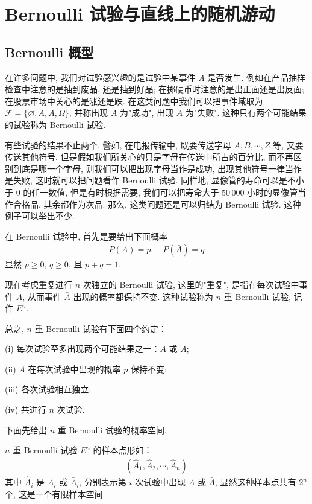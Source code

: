 \documentclass[../../main.tex]{subfiles}
\begin{document}
\section{Bernoulli 试验与直线上的随机游动}\label{section:ch02-Bernoulli试验与随机游动}

\subsection{Bernoulli 概型}

在许多问题中, 我们对试验感兴趣的是试验中某事件 $A$ 是否发生. 例如在产品抽样检查中注意的是抽到废品, 还是抽到好品; 在掷硬币时注意的是出正面还是出反面; 在股票市场中关心的是涨还是跌. 在这类问题中我们可以把事件域取为 $\mathscr{F}=\{\varnothing, A, \bar{A}, \Omega\}$, 并称出现 $A$ 为"成功", 出现 $\bar{A}$ 为"失败". 这种只有两个可能结果的试验称为 Bernoulli 试验.

有些试验的结果不止两个, 譬如, 在电报传输中, 既要传送字母 $A, B, \cdots, Z$ 等, 又要传送其他符号. 但是假如我们所关心的只是字母在传送中所占的百分比, 而不再区别到底是哪一个字母, 则我们可以把出现字母当作是成功, 出现其他符号一律当作是失败, 这时就可以把问题看作 Bernoulli 试验. 同样地, 显像管的寿命可以是不小于 $0$ 的任一数值, 但是有时根据需要, 我们可以把寿命大于 $50\,000$ 小时的显像管当作合格品, 其余都作为次品. 那么, 这类问题还是可以归结为 Bernoulli 试验. 这种例子可以举出不少.

在 Bernoulli 试验中, 首先是要给出下面概率
\begin{align}\label{align:ch02-Bernoulli概率}
P(A)=p,\quad P(\bar{A})=q
\end{align}
显然 $p\geqslant 0$, $q\geqslant 0$, 且 $p+q=1$.

现在考虑重复进行 $n$ 次独立的 Bernoulli 试验, 这里的"重复", 是指在每次试验中事件 $A$, 从而事件 $\bar{A}$ 出现的概率都保持不变. 这种试验称为 $n$ 重 Bernoulli 试验, 记作 $E^n$.

总之, $n$ 重 Bernoulli 试验有下面四个约定：

(i) 每次试验至多出现两个可能结果之一：$A$ 或 $\bar{A}$;

(ii) $A$ 在每次试验中出现的概率 $p$ 保持不变;

(iii) 各次试验相互独立;

(iv) 共进行 $n$ 次试验.

下面先给出 $n$ 重 Bernoulli 试验的概率空间.

$n$ 重 Bernoulli 试验 $E^n$ 的样本点形如：
\begin{align}\label{align:ch02-Bernoulli样本点}
(\hat{A}_1,\hat{A}_2,\cdots,\hat{A}_n)
\end{align}
其中 $\hat{A}_i$ 是 $A_i$ 或 $\bar{A}_i$, 分别表示第 $i$ 次试验中出现 $A$ 或 $\bar{A}$, 显然这种样本点共有 $2^n$ 个, 这是一个有限样本空间.
\end{document}
